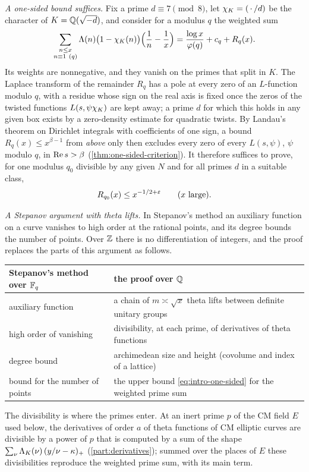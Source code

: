 \emph{A one-sided bound suffices.} Fix a prime $d\equiv7\pmod8$, let $\chi_K=(\,\cdot\,/d)$ be the
character of $K=\mathbb{Q}(\sqrt{-d})$, and consider for a modulus $q$ the weighted sum
\[
  \sum_{\substack{n\le x\\n\equiv1\ (q)}}\Lam(n)\bigl(1-\chiK(n)\bigr)\Bigl(\frac1n-\frac1x\Bigr)
  =\frac{\log x}{\totient(q)}+c_q+R_q(x).
\]
Its weights are nonnegative, and they vanish on the primes that split in $K$. The Laplace transform of
the remainder $R_q$ has a pole at every zero of an $L$-function modulo $q$, with a residue whose sign
on the real axis is fixed once the zeros of the twisted functions $L(s,\psi\chi_K)$ are kept away; a
prime $d$ for which this holds in any given box exists by a zero-density estimate for quadratic twists.
By Landau's theorem on Dirichlet integrals with coefficients of one sign, a bound
$R_q(x)\le x^{\beta-1}$ from \emph{above} only then excludes every zero of every $L(s,\psi)$, $\psi$
modulo $q$, in $\operatorname{Re} s>\beta$ (\cref{thm:one-sided-criterion}). It therefore suffices to prove, for one
modulus $q_0$ divisible by any given $N$ and for all primes $d$ in a suitable class,
\begin{equation}\label{eq:intro-one-sided}
  R_{q_0}(x)\le x^{-1/2+\varepsilon}\qquad(x\ \text{large}).
\end{equation}

\emph{A Stepanov argument with theta lifts.} In Stepanov's method an auxiliary function on a curve
vanishes to high order at the rational points, and its degree bounds the number of points. Over $\mathbb{Z}$
there is no differentiation of integers, and the proof replaces the parts of this argument as follows.
\begin{center}
\begin{tabular}{@{}>{\raggedright\arraybackslash}p{}>{\raggedright\arraybackslash}p{}@{}}
\toprule
Stepanov's method over $\mathbb{F}_q$ & the proof over $\mathbb{Q}$\\
\midrule
auxiliary function & a chain of $m\asymp\sqrt x$ theta lifts between definite unitary groups\\
high order of vanishing & divisibility, at each prime, of derivatives of theta functions\\
degree bound & archimedean size and height (covolume and index of a lattice)\\
bound for the number of points & the upper bound \eqref{eq:intro-one-sided} for the weighted prime sum\\
\bottomrule
\end{tabular}
\end{center}
The divisibility is where the primes enter. At an inert prime $p$ of the CM field $E$ used below,
the derivatives of order $a$ of theta functions of CM elliptic curves are divisible by a power of
$p$ that is computed by a sum of the shape $\sum_{\nu}\Lambda_K(\nu)\,(y/\nu-\kappa)_+$
(\cref{part:derivatives}); summed over the places of $E$ these divisibilities reproduce the weighted
prime sum, with its main term.

